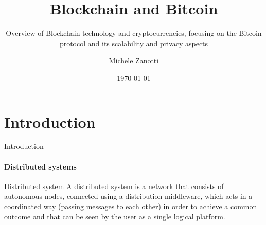 \documentclass{beamer}
\title{Blockchain and Bitcoin}
\subtitle[]{Overview of Blockchain technology and cryptocurrencies, focusing on
the Bitcoin protocol and its scalability and privacy aspects}
\institute[]{Università degli studi di Brescia}
\author{Michele Zanotti}
\date{\today}
\begin{document}
  \begin{frame}
    \titlepage
  \end{frame}

  \section{Introduction}
  \begin{frame}{Introduction}
    \framesubtitle{Distributed systems}
    \begin{block}{Distributed system}
      A distributed system is a network that consists of autonomous nodes,
      connected using a distribution middleware, which acts in a coordinated way
      (passing messages to each other) in order to achieve a common outcome and
      that can be seen by the user as a single logical platform.
    \end{block}
  \end{frame}
\end{document}
